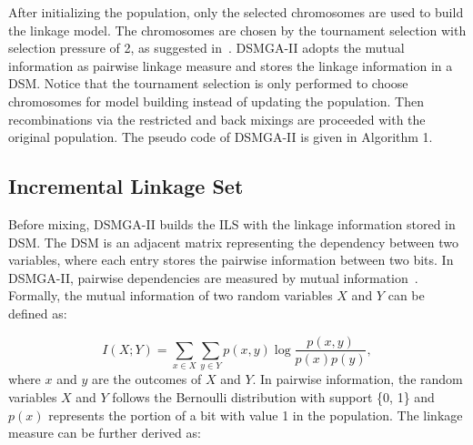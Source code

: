 After initializing the population, only the selected chromosomes are used to build the linkage model. 
The chromosomes are chosen by the tournament selection with selection pressure of 2, as suggested in~\cite{yu:population}. 
DSMGA-II adopts the mutual information as pairwise linkage measure and stores the linkage information in a DSM. 
Notice that the tournament selection is only performed to choose chromosomes for model building instead of updating the population. 
Then recombinations via the restricted and back mixings are proceeded with the original population. 
The pseudo code of DSMGA-II is given in Algorithm 1.



\subsection{Incremental Linkage Set}
Before mixing, DSMGA-II builds the ILS with the linkage information stored in DSM. 
The DSM is an adjacent matrix representing the dependency between two variables, where each entry stores the pairwise information between two bits. 
In DSMGA-II, pairwise dependencies are measured by mutual information~\cite{kullback:KL-diversion}. 
Formally, the mutual information of two random variables $X$ and $Y$ can be defined as:

\begin{displaymath} 
I(X;Y) = \sum_{x \in X}\sum_{y \in Y} p(x,y)  \log{ \frac{p(x,y)}{p(x) p(y)} }, 
\end{displaymath}
where $x$ and $y$ are the outcomes of $X$ and $Y$. 
In pairwise information, the random variables $X$ and $Y$ follows the Bernoulli distribution with support \{0, 1\} and $p(x)$ represents the portion of a bit with value 1 in the population. 
The linkage measure can be further derived as:


